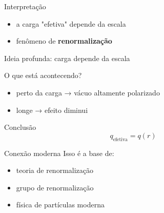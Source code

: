 \documentclass[aspectratio=169]{beamer}
\begin{document}
\begin{frame}
\begin{alertblock}{Interpretação}
\begin{itemize}
\item a carga "efetiva" depende da escala
\item fenômeno de \textbf{renormalização}
\end{itemize}
\end{alertblock}

\end{frame}


\begin{frame}{Ideia profunda: carga depende da escala}

\begin{block}{O que está acontecendo?}
\begin{itemize}
\item perto da carga → vácuo altamente polarizado
\item longe → efeito diminui
\end{itemize}
\end{block}

\pause

\begin{alertblock}{Conclusão}
\[
q_{\text{efetiva}} = q(r)
\]
\end{alertblock}

\pause

\begin{block}{Conexão moderna}
Isso é a base de:
\begin{itemize}
\item teoria de renormalização
\item grupo de renormalização
\item física de partículas moderna
\end{itemize}
\end{block}

\end{frame}

\end{document}
